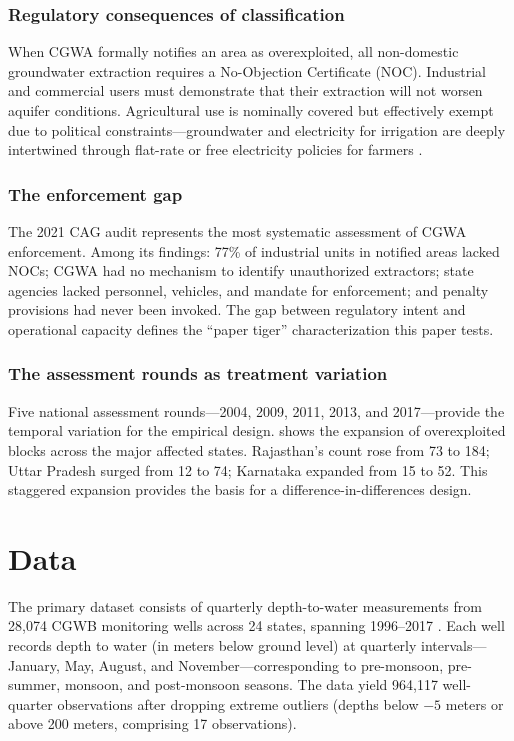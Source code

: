 \documentclass[12pt]{article}
\begin{document}
\subsubsection*{Regulatory consequences of classification} When CGWA formally notifies an area as overexploited, all non-domestic groundwater extraction requires a No-Objection Certificate (NOC). Industrial and commercial users must demonstrate that their extraction will not worsen aquifer conditions. Agricultural use is nominally covered but effectively exempt due to political constraints---groundwater and electricity for irrigation are deeply intertwined through flat-rate or free electricity policies for farmers \citep{shah2009taming}.

\subsubsection*{The enforcement gap} The 2021 CAG audit represents the most systematic assessment of CGWA enforcement. Among its findings: 77\% of industrial units in notified areas lacked NOCs; CGWA had no mechanism to identify unauthorized extractors; state agencies lacked personnel, vehicles, and mandate for enforcement; and penalty provisions had never been invoked. The gap between regulatory intent and operational capacity defines the ``paper tiger'' characterization this paper tests.

\subsubsection*{The assessment rounds as treatment variation} Five national assessment rounds---2004, 2009, 2011, 2013, and 2017---provide the temporal variation for the empirical design.  shows the expansion of overexploited blocks across the major affected states. Rajasthan's count rose from 73 to 184; Uttar Pradesh surged from 12 to 74; Karnataka expanded from 15 to 52. This staggered expansion provides the basis for a difference-in-differences design.

\section{Data}

The primary dataset consists of quarterly depth-to-water measurements from 28,074 CGWB monitoring wells across 24 states, spanning 1996--2017 \citep{cgwb_github}. Each well records depth to water (in meters below ground level) at quarterly intervals---January, May, August, and November---corresponding to pre-monsoon, pre-summer, monsoon, and post-monsoon seasons. The data yield 964,117 well-quarter observations after dropping extreme outliers (depths below $-5$ meters or above 200 meters, comprising 17 observations).
\end{document}
